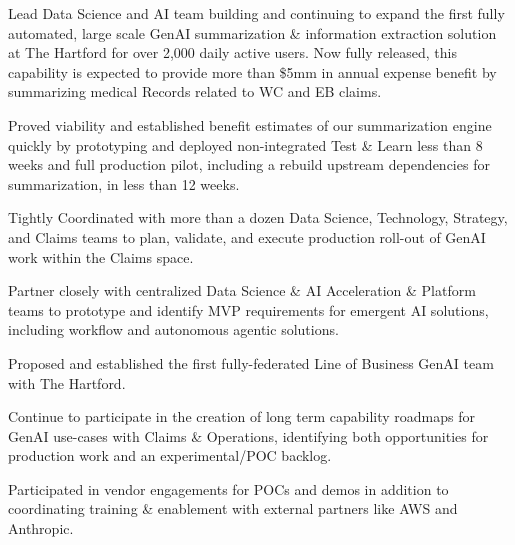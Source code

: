 \documentclass[letterpaper]{deedy-resume} %
\begin{document}
\begin{minipage}[t]{0.68\textwidth}
  \hfill
  \hfill
  \vspace{\topsep}
  \begin{tightitemize}
    \item Lead Data Science and AI team building and continuing to expand the first fully automated, large scale GenAI summarization \&
      information extraction solution at The Hartford for over 2,000 daily active users. 
      Now fully released, this capability is expected to provide more than \$5mm in annual expense benefit 
      by summarizing medical Records related to WC and EB claims.
    \item Proved viability and established benefit estimates of our summarization engine quickly by prototyping and 
      deployed non-integrated Test \& Learn less than 8 weeks and full production pilot, including a rebuild upstream dependencies for summarization, 
      in less than 12 weeks.
    \item Tightly Coordinated with more than a dozen Data Science, Technology, Strategy, and Claims teams
      to plan, validate, and execute production roll-out of GenAI work within the Claims space.
    \item Partner closely with centralized Data Science \& AI Acceleration \& Platform teams to prototype and
    identify MVP requirements for emergent AI solutions, including workflow and autonomous agentic solutions.
    \item Proposed and established the first fully-federated Line of Business GenAI team with The Hartford.
    \item Continue to participate in the creation of long term capability roadmaps for GenAI 
      use-cases with Claims \& Operations, identifying both opportunities for production 
      work and an experimental/POC backlog.
    \item Participated in vendor engagements for POCs and demos in addition to coordinating
      training \& enablement with external partners like AWS and Anthropic.
  \end{tightitemize}
  \sectionspace
  

\end{minipage}
\end{document}
